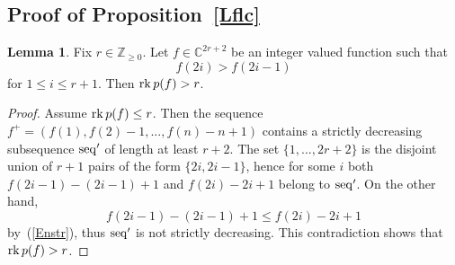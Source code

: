 \documentclass[10pt]{amsart}\oddsidemargin -1mm \evensidemargin -1mm \topmargin -15mm\headheight5mm \headsep 3.5mm \textheight 245mm\textwidth 170mm %
\theoremstyle{definition}\newtheorem{theorem}{Theorem}[section]\newtheorem{lemma}[theorem]{Lemma}\newtheorem{remark}[theorem]{Remark}\newtheorem{proposition}[theorem]{Proposition}\newtheorem{corollary}[theorem]{Corollary}\newtheorem{definition}[theorem]{Definition}\newtheorem{Ex}[theorem]{Example}
\newcounter{AP}
\begin{document}
\subsection{Proof of Proposition~\ref{Lflc}}\label{SSflc}
\begin{lemma}\label{Lcex} Fix $r\in\mathbb Z_{\ge0}$. Let $f\in \mathbb C^{2r+2}$
be an integer valued function such that\begin{equation}f(2i)>
f(2i-1)\label{Enstr}\end{equation}for $1\le i\le r+1$. Then $\operatorname{\mathrm{rk}}
p(f)> r$.\end{lemma}
\begin{proof} Assume $\operatorname{\mathrm{rk}} p(f)\le r$. Then the sequence $f^+=(f(1), f(2)-1,..., f(n)-n+1)$
contains a strictly decreasing subsequence $\operatorname{\mathrm{seq}}'$ of length at least $r+2$. The set $\{1,..., 2r+2\}$ is the disjoint union of $r+1$ pairs of the form $\{2i, 2i-1\}$, hence for some $i$
both $f(2i-1)-(2i-1)+1$ and $f(2i)-2i+1$ belong to $\operatorname{\mathrm{seq}}'$. On the other hand,
$$f(2i-1)-(2i-1)+1\le f(2i)-2i+1$$ by~(\ref{Enstr}), thus $\operatorname{\mathrm{seq}}'$ is not
strictly decreasing. This contradiction shows that
$\operatorname{\mathrm{rk}} p(f)> r$.\end{proof}
\end{document}
